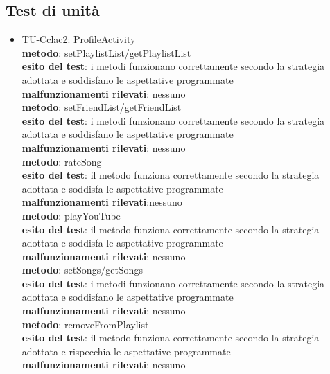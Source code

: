 \subsection{Test di unit\`a}
\begin{itemize}
    
  \item TU-Cclac2: ProfileActivity\\
  \textbf{metodo}: setPlaylistList/getPlaylistList\\
  \textbf{esito del test}: i metodi funzionano correttamente secondo la
  strategia adottata e soddisfano le aspettative programmate\\
  \textbf{malfunzionamenti rilevati}: nessuno\\
  
  \textbf{metodo}: setFriendList/getFriendList\\
  \textbf{esito del test}: i metodi funzionano correttamente secondo la
  strategia adottata e soddisfano le aspettative programmate\\
  \textbf{malfunzionamenti rilevati}: nessuno\\
  
  \textbf{metodo}: rateSong\\
  \textbf{esito del test}: il metodo funziona correttamente secondo la strategia
  adottata e soddisfa le aspettative programmate\\ 
  \textbf{malfunzionamenti
  rilevati}:nessuno\\
  
  \textbf{metodo}: playYouTube\\
  \textbf{esito del test}: il metodo funziona correttamente secondo la strategia
  adottata e soddisfa le aspettative programmate\\
  \textbf{malfunzionamenti rilevati}: nessuno\\
  
  \textbf{metodo}: setSongs/getSongs\\
  \textbf{esito del test}: i metodi funzionano correttamente secondo la
  strategia adottata e soddisfano le aspettative programmate\\
  \textbf{malfunzionamenti rilevati}: nessuno\\
  
  \textbf{metodo}: removeFromPlaylist\\
  \textbf{esito del test}: il metodo funziona correttamente secondo la strategia
  adottata e rispecchia le aspettative programmate\\
  \textbf{malfunzionamenti rilevati}: nessuno\\
  

\end{itemize}
